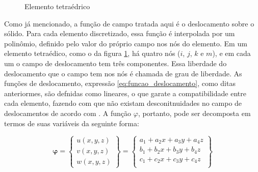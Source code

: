 \begin{figure} 
    \centering
    \caption{Elemento tetraédrico}
    \label{fig:tetraedro}
\end{figure}

Como já mencionado, a função de campo tratada aqui é o deslocamento sobre o sólido. Para cada elemento discretizado, essa função é interpolada por um polinômio, definido pelo valor do próprio campo nos nós do elemento. Em um elemento tetraédico, como o da figura \ref{fig:tetraedro}, há quatro nós ($i$, $j$, $k$ e $m$), e em cada um o campo de deslocamento tem três componentes. Essa liberdade do deslocamento que o campo tem nos nós é chamada de grau de liberdade. As funções de deslocamento, expressão \ref{eq:funcao_deslocamento}, como ditas anteriormes, são defnidas como lineares, o que garate a compatibilidade entre cada elemento, fazendo com que não existam desconitnuidades no campo de deslocamentos de acordo com . A função $\varphi$, portanto, pode ser decomposta em termos de suas variáveis da seguinte forma:

\begin{equation} \label{eq:linear}
    \mathbf{\varphi} = 
    \begin{Bmatrix}
        u(x,y,z) \\ v(x,y,z) \\ w(x,y,z)
    \end{Bmatrix} 
    = \begin{Bmatrix}
        a_1 + a_2 x + a_3 y + a_4 z\\
        b_1 + b_2 x + b_3 y + b_4 z\\
        c_1 + c_2 x + c_3 y + c_4 z\\
    \end{Bmatrix}
\end{equation}

